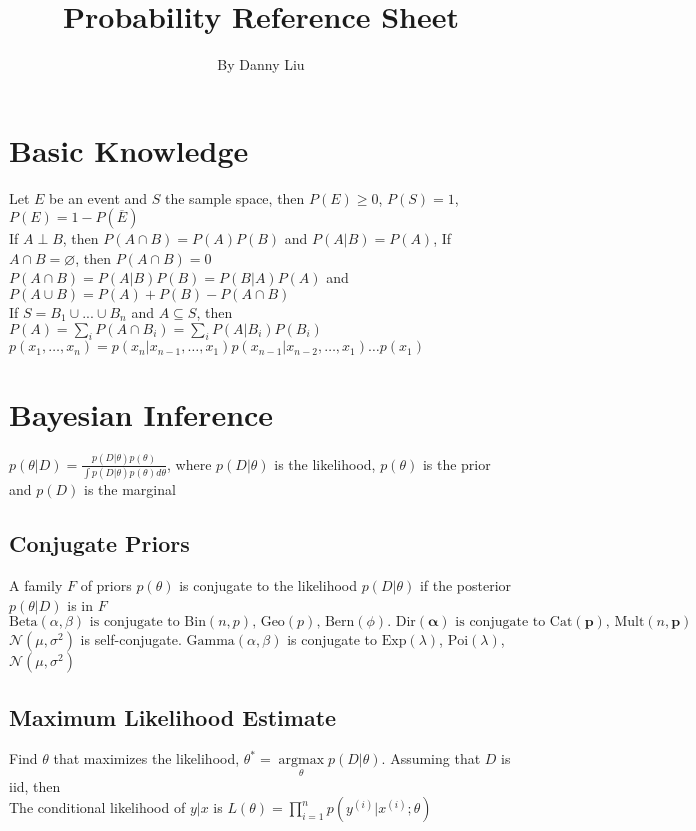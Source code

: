\documentclass{article}
\title{Probability Reference Sheet}
\author{By Danny Liu}
\date{}
\DeclareMathOperator*{\argmax}{argmax}
\begin{document}
\maketitle

\section{Basic Knowledge}
Let $E$ be an event and $S$ the sample space, then $P(E) \geq 0$, $P(S) = 1$, $P(E) = 1-P(\overline{E})$ \\
If $A \perp B$, then $P(A\cap B) = P(A)P(B)$ and $P(A|B) = P(A)$, If $A \cap B = \varnothing$, then $P(A\cap B) = 0$ \\
$P(A\cap B) = P(A|B)P(B) = P(B|A)P(A)$ and $P(A\cup B) = P(A) + P(B) - P(A\cap B)$ \\
If $S = B_1\cup ... \cup B_n$ and $A \subseteq S$, then $P(A) = \sum_i P(A \cap B_i) = \sum_i P(A |B_i)P(B_i)$ \\
$p(x_1, \ldots, x_n) = p(x_n | x_{n-1}, \ldots , x_1) p(x_{n-1} | x_{n-2}, \ldots, x_1) \ldots p(x_1)$ 

\section{Bayesian Inference}
$p(\theta|D) = \frac{p(D|\theta)p(\theta)}{\int p(D|\theta)p(\theta) d\theta}$, where $p(D|\theta)$ is the likelihood, $p(\theta)$ is the prior and $p(D)$ is the marginal

\subsection{Conjugate Priors}
A family $F$ of priors $p(\theta)$ is conjugate to the likelihood $p(D|\theta)$ if the posterior $p(\theta|D)$ is in $F$ \\
$\mbox{Beta}(\alpha, \beta)\mbox{ is conjugate to Bin}(n, p)\mbox{, Geo}(p)\mbox{, Bern}(\phi) \mbox{. Dir}(\boldsymbol \alpha)\mbox{ is conjugate to Cat}(\boldsymbol p)\mbox{, Mult}(n, \boldsymbol p)$ \\
$\mathcal{N}(\mu, \sigma^2)$ is self-conjugate. $\mbox{Gamma}(\alpha, \beta)$ is conjugate to $\mbox{Exp}(\lambda)$, $\mbox{Poi}(\lambda)$, $\mathcal{N}(\mu, \sigma^2)$

\subsection{Maximum Likelihood Estimate}
Find $\theta$ that maximizes the likelihood, $\theta^* = \argmax\limits_\theta p(D|\theta)$. Assuming that $D$ is iid, then \\
The conditional likelihood of $y|x$ is $L(\theta) = \prod\limits_{i=1}^np(y^{(i)}|x^{(i)}; \theta)$ 
\end{document}

